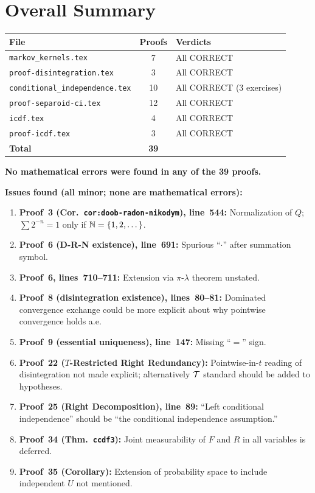 \documentclass{article}
\begin{document}

\part*{Overall Summary}

\begin{center}
\begin{tabular}{l|c|l}
\textbf{File} & \textbf{Proofs} & \textbf{Verdicts} \\ \hline
\texttt{markov\_kernels.tex} & 7 & All CORRECT \\
\texttt{proof-disintegration.tex} & 3 & All CORRECT \\
\texttt{conditional\_independence.tex} & 10 & All CORRECT (3 exercises) \\
\texttt{proof-separoid-ci.tex} & 12 & All CORRECT \\
\texttt{icdf.tex} & 4 & All CORRECT \\
\texttt{proof-icdf.tex} & 3 & All CORRECT \\ \hline
\textbf{Total} & \textbf{39} &
\end{tabular}
\end{center}

\textbf{No mathematical errors were found in any of the 39 proofs.}

\bigskip\noindent
\textbf{Issues found (all minor; none are mathematical errors):}
\begin{enumerate}
  \item \textbf{Proof~3 (Cor.\ \texttt{cor:doob-radon-nikodym}), line~544:}
        Normalization of $Q$; $\sum 2^{-n}=1$ only if $\mathbb{N}=\{1,2,\dots\}$.
  \item \textbf{Proof~6 (D-R-N existence), line~691:}
        Spurious ``$\cdot$'' after summation symbol.
  \item \textbf{Proof~6, lines~710--711:}
        Extension via $\pi$-$\lambda$ theorem unstated.
  \item \textbf{Proof~8 (disintegration existence), lines~80--81:}
        Dominated convergence exchange could be more explicit about
        why pointwise convergence holds a.e.
  \item \textbf{Proof~9 (essential uniqueness), line~147:}
        Missing ``$=$'' sign.
  \item \textbf{Proof~22 ($T$-Restricted Right Redundancy):}
        Pointwise-in-$t$ reading of disintegration not made explicit;
        alternatively $\mathcal{T}$ standard should be added to hypotheses.
  \item \textbf{Proof~25 (Right Decomposition), line~89:}
        ``Left conditional independence'' should be ``the conditional independence assumption.''
  \item \textbf{Proof~34 (Thm.\ \texttt{ccdf3}):}
        Joint measurability of $F$ and $R$ in all variables is deferred.
  \item \textbf{Proof~35 (Corollary):}
        Extension of probability space to include independent $U$ not mentioned.
\end{enumerate}
\end{document}
